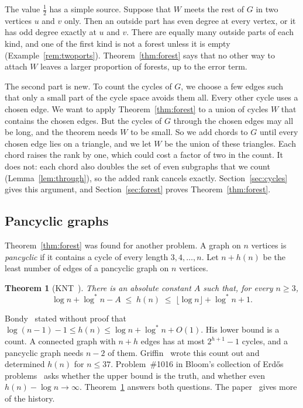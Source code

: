 \documentclass[11pt]{article}
\newtheorem{theorem}{Theorem}[section]
\theoremstyle{definition}
\theoremstyle{remark}
\newcommand{\lgs}{\log^{*}}
\newcommand{\half}{\tfrac12}
\numberwithin{equation}{section}
\begin{document}
The value $\half$ has a simple source. Suppose that $W$ meets the rest of $G$ in two vertices $u$
and $v$ only. Then an outside part has even degree at every vertex, or it has odd degree exactly at
$u$ and $v$. There are equally many outside parts of each kind, and one of the first kind is not a
forest unless it is empty (Example~\ref{rem:twoports}). Theorem~\ref{thm:forest} says that no other
way to attach $W$ leaves a larger proportion of forests, up to the error term.

The second part is new. To count the cycles of $G$, we choose a few edges such that only a small
part of the cycle space avoids them all. Every other cycle uses a chosen edge. We want to apply Theorem~\ref{thm:forest} to a union of cycles $W$ that
contains the chosen edges. But the cycles of $G$ through the chosen edges may all be long, and the
theorem needs $W$ to be small. So we add chords to $G$ until every chosen edge lies on a triangle,
and we let $W$ be the union of these triangles. Each chord raises the rank by one, which could cost
a factor of two in the count. It does not: each chord also doubles the set of even subgraphs that
we count (Lemma~\ref{lem:through}), so the added rank cancels exactly.
Section~\ref{sec:cycles} gives this argument, and Section~\ref{sec:forest} proves
Theorem~\ref{thm:forest}.

\subsection{Pancyclic graphs}

Theorem~\ref{thm:forest} was found for another problem. A graph on $n$ vertices is
\emph{pancyclic} if it contains a cycle of every length $3,4,\dots,n$. Let $n+h(n)$ be the least
number of edges of a pancyclic graph on $n$ vertices.

\begin{theorem}[KNT~\cite{KNT}]\label{thm:main}
There is an absolute constant $A$ such that, for every $n\ge3$,
\[
  \log n+\lgs n-A\;\le\;h(n)\;\le\;\lfloor\log n\rfloor+\lgs n+1 .
\]
\end{theorem}

Bondy~\cite{Bondy} stated without proof that $\log(n-1)-1\le h(n)\le\log n+\lgs n+O(1)$. His lower
bound is a count. A connected graph with $n+h$ edges has at most $2^{h+1}-1$ cycles, and a pancyclic
graph needs $n-2$ of them. Griffin~\cite{Griffin} wrote this count out and determined $h(n)$ for
$n\le37$. Problem~\#1016 in Bloom's collection of Erd\H{o}s problems~\cite{Bloom}
asks whether the upper bound is the truth, and whether even $h(n)-\log n\to\infty$.
Theorem~\ref{thm:main} answers both questions. The paper~\cite{KNT} gives more of the history.
\end{document}
